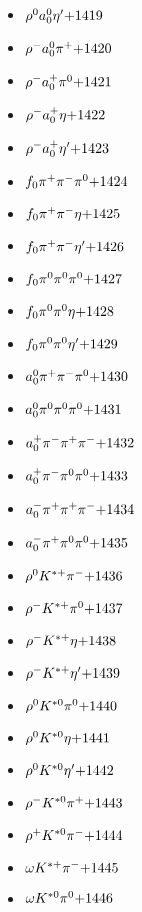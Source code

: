 \begin{multicols}{3}
\begin{itemize}
 \item $ \rho^{0} a_{0}^{0} {\eta^{\prime}} \hfill{+1419}$
 \item $ \rho^{-} a_{0}^{0} \pi^{+} \hfill{+1420}$
 \item $ \rho^{-} a_{0}^{+} \pi^{0} \hfill{+1421}$
 \item $ \rho^{-} a_{0}^{+} \eta \hfill{+1422}$
 \item $ \rho^{-} a_{0}^{+} {\eta^{\prime}} \hfill{+1423}$
 \item $ f_{0} \pi^{+} \pi^{-} \pi^{0} \hfill{+1424}$
 \item $ f_{0} \pi^{+} \pi^{-} \eta \hfill{+1425}$
 \item $ f_{0} \pi^{+} \pi^{-} {\eta^{\prime}} \hfill{+1426}$
 \item $ f_{0} \pi^{0} \pi^{0} \pi^{0} \hfill{+1427}$
 \item $ f_{0} \pi^{0} \pi^{0} \eta \hfill{+1428}$
 \item $ f_{0} \pi^{0} \pi^{0} {\eta^{\prime}} \hfill{+1429}$
 \item $ a_{0}^{0} \pi^{+} \pi^{-} \pi^{0} \hfill{+1430}$
 \item $ a_{0}^{0} \pi^{0} \pi^{0} \pi^{0} \hfill{+1431}$
 \item $ a_{0}^{+} \pi^{-} \pi^{+} \pi^{-} \hfill{+1432}$
 \item $ a_{0}^{+} \pi^{-} \pi^{0} \pi^{0} \hfill{+1433}$
 \item $ a_{0}^{-} \pi^{+} \pi^{+} \pi^{-} \hfill{+1434}$
 \item $ a_{0}^{-} \pi^{+} \pi^{0} \pi^{0} \hfill{+1435}$
 \item $ \rho^{0} K^{*+} \pi^{-} \hfill{+1436}$
 \item $ \rho^{-} K^{*+} \pi^{0} \hfill{+1437}$
 \item $ \rho^{-} K^{*+} \eta \hfill{+1438}$
 \item $ \rho^{-} K^{*+} {\eta^{\prime}} \hfill{+1439}$
 \item $ \rho^{0} K^{*0} \pi^{0} \hfill{+1440}$
 \item $ \rho^{0} K^{*0} \eta \hfill{+1441}$
 \item $ \rho^{0} K^{*0} {\eta^{\prime}} \hfill{+1442}$
 \item $ \rho^{-} K^{*0} \pi^{+} \hfill{+1443}$
 \item $ \rho^{+} K^{*0} \pi^{-} \hfill{+1444}$
 \item $ \omega K^{*+} \pi^{-} \hfill{+1445}$
 \item $ \omega K^{*0} \pi^{0} \hfill{+1446}$

\end{itemize}
\end{multicols}
